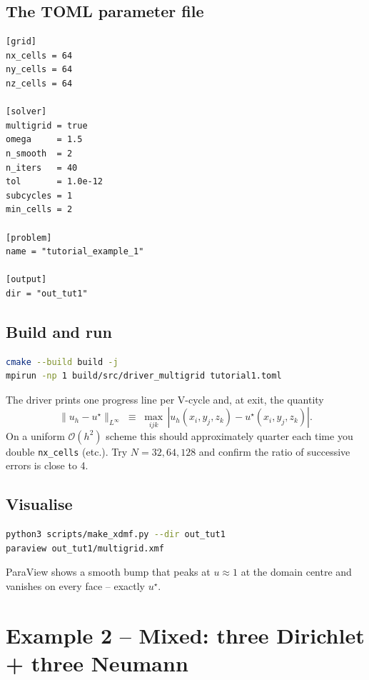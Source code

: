 \documentclass[11pt]{article}
\newcommand{\Linf}{L^{\infty}}
\newcommand{\bigO}{\mathcal{O}}
\begin{document}
\subsection{The TOML parameter file}

\begin{lstlisting}[language={},caption={\tt tutorial1.toml}]
[grid]
nx_cells = 64
ny_cells = 64
nz_cells = 64

[solver]
multigrid = true
omega     = 1.5
n_smooth  = 2
n_iters   = 40
tol       = 1.0e-12
subcycles = 1
min_cells = 2

[problem]
name = "tutorial_example_1"

[output]
dir = "out_tut1"
\end{lstlisting}

\subsection{Build and run}

\begin{lstlisting}[language=bash]
cmake --build build -j
mpirun -np 1 build/src/driver_multigrid tutorial1.toml
\end{lstlisting}
The driver prints one progress line per V-cycle and, at exit, the
quantity
\[
  \|u_h - u^\star\|_{\Linf} \;\equiv\; \max_{ijk}\,
  | u_h(x_i, y_j, z_k) - u^\star(x_i, y_j, z_k) |.
\]
On a uniform $\bigO(h^2)$ scheme this should approximately quarter
each time you double \texttt{nx\_cells} (etc.).  Try $N = 32, 64,
128$ and confirm the ratio of successive errors is close to 4.

\subsection{Visualise}

\begin{lstlisting}[language=bash]
python3 scripts/make_xdmf.py --dir out_tut1
paraview out_tut1/multigrid.xmf
\end{lstlisting}
ParaView shows a smooth bump that peaks at $u \approx 1$ at the
domain centre and vanishes on every face -- exactly $u^\star$.

\section{Example 2 -- Mixed: three Dirichlet + three Neumann}\label{sec:example2}
\end{document}
